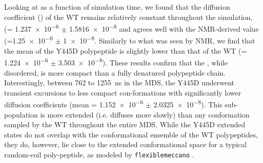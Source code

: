 Looking at \diffusion as a function of simulation time, we found that the diffusion coefficient (\diffusion) of the WT \gct remains relatively constant throughout the simulation, (\diffusion = \num{1.237e-6} $\pm$ \SI{1.5816e-8}{\dcunits} and agrees well with the NMR-derived value (\diffusion=\num{1.25e-6} $\pm$  \SI{1e-8}{\dcunits}.  Similarly to what was seen by NMR, we find that the mean \diffusion of the Y445D \gct polypeptide is slightly lower than that of the WT \gct (\diffusion= \num{1.224e-6} $\pm$ \SI{3.503e-8}{\dcunits}). These results confirm that the \gct, while disordered, is more compact than a fully denatured polypeptide chain. Interestingly, between \num{762} to \SI{1255}{\ns} in the MDS, the Y445D \gct underwent transient excursions to less compact con-formations with significantly lower diffusion coefficients (mean \diffusion= \num{1.152e-6} $\pm$ \SI{2.0325e-8}{\dcunits}). This sub-population is more extended (i.e. diffuses more slowly) than any conformation sampled by the WT \gct throughout the entire MDS. While the Y445D \gct extended states do not overlap with the conformational ensemble of the WT \gct polypeptides, they do, however, lie close to the extended conformational space for a typical random-coil poly-peptide, as modeled by \texttt{flexiblemeccano} .

